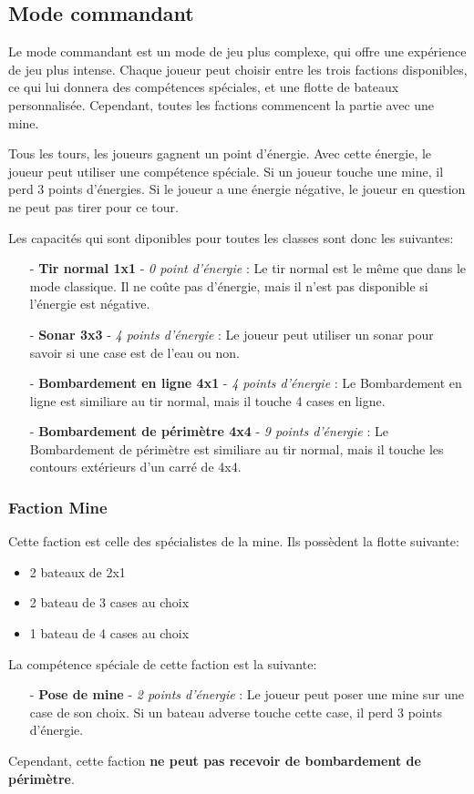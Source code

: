 \documentclass[../besoin_user.tex]{subfiles}
\begin{document}
\subsection{Mode commandant}
Le mode commandant est un mode de jeu plus complexe, qui offre une expérience de jeu plus intense. Chaque joueur peut choisir entre les trois factions disponibles,
ce qui lui donnera des compétences spéciales, et une flotte de bateaux personnalisée. Cependant, toutes les factions commencent la partie avec une mine.

Tous les tours, les joueurs gagnent un point d'énergie. Avec cette énergie, le joueur peut utiliser une compétence spéciale.
Si un joueur touche une mine, il perd 3 points d'énergies. Si le joueur a une énergie négative, le joueur en question ne peut pas tirer pour ce tour.

Les capacités qui sont diponibles pour toutes les classes sont donc les suivantes:
\begin{itemize}
    \item[-] \textbf{Tir normal 1x1} - \textit{0 point d'énergie} : Le tir normal est le même que dans le mode classique. Il ne coûte pas d'énergie, mais il n'est pas disponible si l'énergie est négative.
    \item[-] \textbf{Sonar 3x3} - \textit{4 points d'énergie} : Le joueur peut utiliser un sonar pour savoir si une case est de l'eau ou non.
    \item[-] \textbf{Bombardement en ligne 4x1} - \textit{4 points d'énergie} : Le Bombardement en ligne est similiare au tir normal, mais il touche 4 cases en ligne.
    \item[-] \textbf{Bombardement de périmètre 4x4} - \textit{9 points d'énergie} : Le Bombardement de périmètre est similiare au tir normal, mais il touche les contours extérieurs d'un carré de 4x4.
\end{itemize}

\subsubsection{Faction Mine}
Cette faction est celle des spécialistes de la mine. Ils possèdent la flotte suivante:
\begin{itemize}
    \item 2 bateaux de 2x1
    \item 2 bateau de 3 cases au choix
    \item 1 bateau de 4 cases au choix
\end{itemize}
La compétence spéciale de cette faction est la suivante:
\begin{itemize}
    \item[-] \textbf{Pose de mine} - \textit{2 points d'énergie} : Le joueur peut poser une mine sur une case de son choix. Si un bateau adverse touche cette case, il perd 3 points d'énergie.
\end{itemize}
Cependant, cette faction \textbf{ne peut pas recevoir de bombardement de périmètre}.
\end{document}
